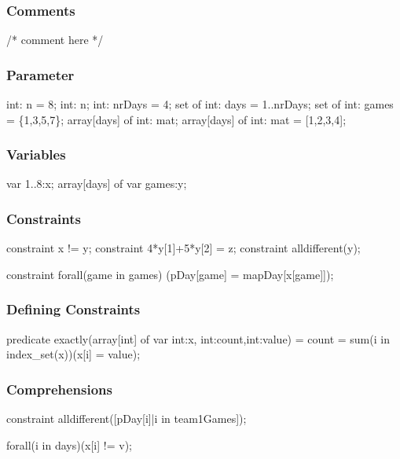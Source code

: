 \begin{frame}[fragile]
  \frametitle{Comments}
  \begin{semiverbatim}
    /* comment here */
  \end{semiverbatim}
\end{frame}

\begin{frame}[fragile]
  \frametitle{Parameter}
  \begin{semiverbatim}
    int: n = 8;
    int: n; %
    int: nrDays = 4;
    set of int: days = 1..nrDays;
    set of int: games = \{1,3,5,7\};
    array[days] of int: mat;
    array[days] of int: mat = [1,2,3,4];
  \end{semiverbatim}
\end{frame}

\begin{frame}[fragile]
  \frametitle{Variables}
  \begin{semiverbatim}
    var 1..8:x;
    array[days] of var games:y;
  \end{semiverbatim}
\end{frame}

\begin{frame}[fragile]
  \frametitle{Constraints}
  \begin{semiverbatim}
    constraint x != y;
    constraint 4*y[1]+5*y[2] = z;
    constraint alldifferent(y);

    constraint forall(game in games)
      (pDay[game] = mapDay[x[game]]);
  \end{semiverbatim}
\end{frame}

\begin{frame}[fragile]
  \frametitle{Defining Constraints}
  \begin{semiverbatim}
predicate exactly(array[int] of var int:x,
    int:count,int:value) = 
  count = sum(i in index\_set(x))(x[i] = value);
  \end{semiverbatim}
\end{frame}

\begin{frame}[fragile]
  \frametitle{Comprehensions}
  \begin{semiverbatim}
constraint alldifferent([pDay[i]|i in team1Games]);

forall(i in days)(x[i] != v);
    
  \end{semiverbatim}
\end{frame}


